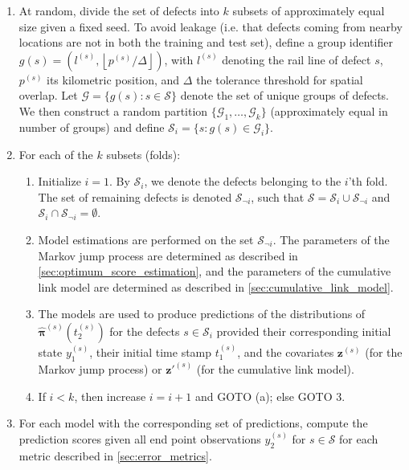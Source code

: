 \begin{enumerate}
    \item At random, divide the set of defects into $k$ subsets of approximately equal size given a fixed seed. To avoid leakage (i.e. that defects coming from nearby locations are not in both the training and test set), define a group identifier $g(s) = (l^{(s)},\left \lfloor{p^{(s)}/\Delta}\right \rfloor )$, with $l^{(s)}$ denoting the rail line of defect $s$, $p^{(s)}$ its kilometric position, and $\Delta$ the tolerance threshold for spatial overlap. Let $\mathcal{G} = \{g(s) : s \in \mathcal S\}$ denote the set of unique groups of defects. We then construct a random partition $\{\mathcal{G}_1, \dots, \mathcal{G}_k\}$ (approximately equal in number of groups) and define $\mathcal S_i = \{s : g(s) \in \mathcal G_i\}$. 
    \item For each of the $k$ subsets (folds):
    \begin{enumerate}
        \item Initialize $i = 1$. By $\mathcal{S}_i$, we denote the defects belonging to the $i$'th fold. The set of remaining defects is denoted $\mathcal{S}_{\neg i}$, such that $\mathcal{S} = \mathcal{S}_i \cup \mathcal{S}_{\neg i}$ and $\mathcal{S}_i \cap \mathcal{S}_{\neg i} = \emptyset$.
        \item Model estimations are performed on the set $\mathcal{S}_{\neg i}$. The parameters of the Markov jump process are determined as described in \cref{sec:optimum_score_estimation}, and the parameters of the cumulative link model are determined as described in \cref{sec:cumulative_link_model}.
        \item The models are used to produce predictions of the distributions of $\widehat{\bm{\pi}}^{(s)}\left( t_2^{(s)}\right)$ for the defects $s \in \mathcal{S}_i$ provided their corresponding initial state $y_1^{(s)}$, their initial time stamp $t_1^{(s)}$, and the covariates $\bm{z}^{(s)}$ (for the Markov jump process) or $\bm{z}'^{(s)}$ (for the cumulative link model).
        \item If $i < k$, then increase $i = i + 1$ and GOTO (a); else GOTO 3.
    \end{enumerate}
    \item For each model with the corresponding set of predictions, compute the prediction scores given all end point observations $y_2^{(s)}$ for $s \in \mathcal{S}$ for each metric described in \cref{sec:error_metrics}.
\end{enumerate}
 
